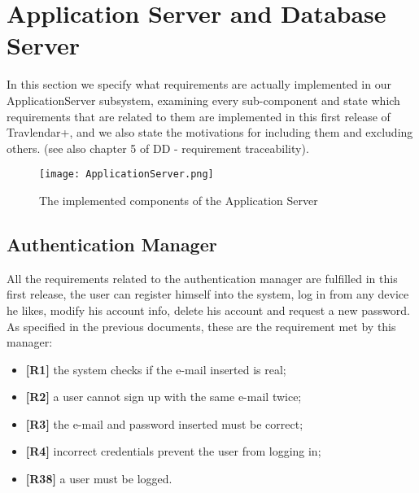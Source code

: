 \section{Application Server and Database Server}
\label{sec:ApplAndDBServers}
In this section we specify what requirements are actually implemented in our ApplicationServer subsystem, examining every sub-component and state which requirements that are related to them are implemented in this first release of Travlendar+, and we also state the motivations for including them and excluding others. (see also chapter 5 of DD - requirement traceability).
\begin{figure}[H]
	\begin{center}
		\hspace*{-60pt}
		\texttt{[image: ApplicationServer.png]}
	\end{center}
\caption{The implemented components of the Application Server}
\end{figure}

\subsection{Authentication Manager}
All the requirements related to the authentication manager are fulfilled in this first release, the user can register himself into the system, log in from any device he likes, modify his account info, delete his account and request a new password. As specified in the previous documents, these are the requirement met by this manager:
\begin{itemize}
	\item \textbf{[R1]} the system checks if the e-mail inserted is real;
	\item \textbf{[R2]} a user cannot sign up with the same e-mail twice;
	\item \textbf{[R3]} the e-mail and password inserted must be correct;
	\item \textbf{[R4]} incorrect credentials prevent the user from logging in;
	\item \textbf{[R38]} a user must be logged.
\end{itemize}

